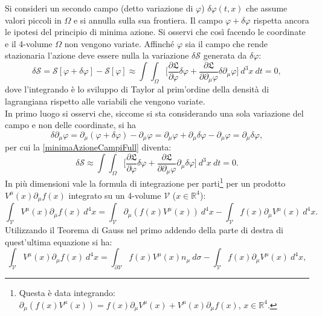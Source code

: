  Si consideri un secondo campo (detto variazione di $\varphi$) $\delta\varphi(t,x)$ che assume valori piccoli in $\Omega$ e si annulla sulla sua frontiera. Il campo $\varphi+\delta\varphi$ rispetta ancora le ipotesi del principio di minima azione. Si osservi che così facendo le coordinate e il 4-volume $\Omega$ non vengono variate. Affinché $\varphi$ sia il campo che rende stazionaria l'azione deve essere nulla la variazione $\delta\mathcal{S}$ generata da $\delta\varphi$:
\begin{equation}
    \delta\mathcal{S}=\mathcal{S}[\varphi+\delta\varphi]-\mathcal{S}[\varphi]\approx\int\int_{\Omega}\bigg[\frac{\partial\mathfrak{L}}{\partial \varphi}\delta\varphi+\frac{\partial\mathfrak{L}}{\partial \partial_\mu\varphi}\delta\partial_\mu\varphi\bigg]\ d^3x\ dt=0,\label{minimaAzioneCampiFull}
\end{equation}
dove l'integrando è lo sviluppo di Taylor al prim'ordine della densità di lagrangiana rispetto alle variabili che vengono variate.\\
In primo luogo si osservi che, siccome si sta considerando una sola variazione del campo e non delle coordinate, si ha
\begin{equation*}
    \delta\partial_\mu\varphi=\partial_\mu(\varphi+\delta\varphi)-\partial_\mu\varphi=\partial_\mu\varphi+\partial_\mu\delta\varphi-\partial_\mu\varphi=\partial_\mu\delta\varphi,
\end{equation*}
per cui la \eqref{minimaAzioneCampiFull} diventa:
\begin{equation}
    \delta\mathcal{S}\approx\int\int_{\Omega}\bigg[\frac{\partial\mathfrak{L}}{\partial \varphi}\delta\varphi+\frac{\partial\mathfrak{L}}{\partial \partial_\mu\varphi}\partial_\mu\delta\varphi\bigg]\ d^3x\ dt=0.\label{minimaAzioneCampiFull'}
\end{equation}
In più dimensioni vale la formula di integrazione per parti\footnote{Questa è data integrando: $\partial_\mu(f(x)V^\mu(x))=f(x)\partial_\mu V^\mu(x)+V^\mu(x)\partial_\mu f(x)$, $x\in \mathbb{R}^4$.} per un prodotto $V^\mu(x)\partial_\mu f(x) $ integrato su un 4-volume $\mathcal{V}$ ($x\in \mathbb{R}^4$):
\begin{equation*}
    \int_{\mathcal{V} }V^\mu(x)\partial_\mu f(x)\ d^4x=\int_{\mathcal{V} }\partial_\mu(f(x)V^\mu(x))\ d^4x-\int_{\mathcal{V} }f(x)\partial_\mu V^\mu(x)\ d^4x.
\end{equation*}
Utilizzando il Teorema di Gauss nel primo addendo della parte di destra di quest'ultima equazione si ha:
\begin{equation*}
\int_{\mathcal{V} }V^\mu(x)\partial_\mu f(x)\ d^4x=\int_{\partial\mathcal{V} }f(x)V^\mu(x)n_\mu\ d\sigma-    \int_{\mathcal{V} }f(x)\partial_\mu V^\mu(x)\ d^4x,
\end{equation*}
